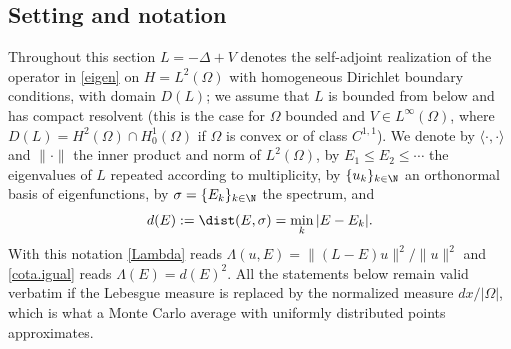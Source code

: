


\subsection*{Setting and notation}

Throughout this section $L=-\Delta+V$ denotes the self-adjoint realization of the
operator in \eqref{eigen} on $H=L^2(\Omega)$ with homogeneous Dirichlet boundary
conditions, with domain $D(L)$; we assume that $L$ is bounded from below and has compact
resolvent (this is the case for $\Omega$ bounded and $V\in L^\infty(\Omega)$, where
$D(L)=H^2(\Omega)\cap H^1_0(\Omega)$ if $\Omega$ is convex or of class $C^{1,1}$).
We denote by $\langle\cdot,\cdot\rangle$ and $\|\cdot\|$ the inner product and norm of
$L^2(\Omega)$, by $E_1\le E_2\le\cdots$ the eigenvalues of $L$ repeated according to
multiplicity, by $\{u_k\}_{k\in\N}$ an orthonormal basis of eigenfunctions, by
$\sigma=\{E_k\}_{k\in\N}$ the spectrum, and
\[
d(E):=\dist(E,\sigma)=\min_k|E-E_k| .
\]
With this notation \eqref{Lambda} reads $\Lambda(u,E)=\|(L-E)u\|^2/\|u\|^2$ and
\eqref{cota.igual} reads $\Lambda(E)=d(E)^2$.
All the statements below remain valid verbatim if the Lebesgue measure is replaced by the
normalized measure $dx/|\Omega|$, which is what a Monte Carlo average with uniformly
distributed points approximates.


